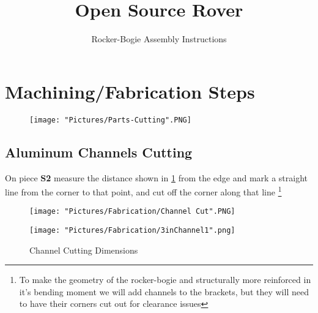 \documentclass[12pt]{article}
\begin{document}
\title{Open Source Rover}
\author{Rocker-Bogie Assembly Instructions}

\makeatletter         
\def\@maketitle{
\begin{center}	
	\makebox[\textwidth][c]{ \texttt{[image: "Pictures/Rocker-Bogie/Rocker Bogie Title".png]}}
	{\Huge \bfseries \sffamily \@title }\\[4ex] 
	{\huge \bfseries \sffamily \@author}\\[4ex] 
	\texttt{[image: "Pictures/Misc/JPL logo".png]}
\end{center}}
\makeatother

\maketitle


\newpage

\tableofcontents

\newpage
\section{Machining/Fabrication Steps}

\begin{figure}[H]
	\centering
	\texttt{[image: "Pictures/Parts-Cutting".PNG]}
\end{figure}

\subsection{Aluminum Channels Cutting}
On piece \textbf{S2} measure the distance shown in \ref {channel dimensions} from the edge and mark a straight line from the corner to that point, and cut off the corner along that line \footnote{To make the geometry of the rocker-bogie and structurally more reinforced in it's bending moment we will add channels to the brackets, but they will need to have their corners cut out for clearance issues}

\begin{figure}[H]
  \centering
  \begin{minipage}[b]{0.45\textwidth}
    \texttt{[image: "Pictures/Fabrication/Channel Cut".PNG]}
  \end{minipage}
  \hfill
  \begin{minipage}[b]{0.45\textwidth}
    \texttt{[image: "Pictures/Fabrication/3inChannel1".png]}
  \end{minipage}
  \caption{Channel Cutting Dimensions}
  \label{channel dimensions}
\end{figure}
\end{document}
